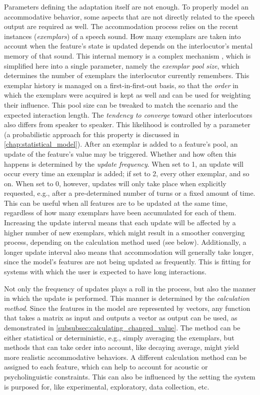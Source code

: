 Parameters defining the adaptation itself are not enough.
To properly model an accommodative behavior, some aspects that are not directly related to the speech output are required as well.
The accommodation process relies on the recent instances (\emph{exemplars}) of a speech sound.
How many exemplars are taken into account when the feature's state is updated depends on the interlocutor's mental memory of that sound.
This internal memory is a complex mechanism \citep{Baddeley2003working}, which is simplified here into a single parameter, namely the \emph{exemplar pool size}, which determines the number of exemplars the interlocutor currently remembers.
This exemplar history is managed on a first-in-first-out basis, so that the \emph{order} in which the exemplars were acquired is kept as well and can be used for weighting their influence.
This pool size can be tweaked to match the scenario and the expected interaction length.
The \emph{tendency to converge} toward other interlocutors also differs from speaker to speaker.
This likelihood is controlled by a parameter (a probabilistic approach for this property is discussed in \cref{chap:statistical_model}).
After an exemplar is added to a feature's pool, an update of the feature's value may be triggered.
Whether and how often this happens is determined by the \emph{update frequency}.
When set to 1, an update will occur every time an exemplar is added; if set to 2, every other exemplar, and so on.
When set to 0, however, updates will only take place when explicitly requested, e.g., after a pre-determined number of turns or a fixed amount of time.
This can be useful when all features are to be updated at the same time, regardless of how many exemplars have been accumulated for each of them.
Increasing the update interval means that each update will be affected by a higher number of new exemplars, which might result in a smoother converging process, depending on the calculation method used (see below).
Additionally, a longer update interval also means that accommodation will generally take longer, since the model's features are not being updated as frequently.
This is fitting for systems with which the user is expected to have long interactions.

Not only the frequency of updates plays a roll in the process, but also the manner in which the update is performed.
This manner is determined by the \emph{calculation method}.
Since the features in the model are represented by vectors, any function that takes a matrix as input and outputs a vector as output can be used, as demonstrated in \cref{subsubsec:calculating_changed_value}.
The method can be either statistical or deterministic, e.g., simply averaging the exemplars, but methods that can take order into account, like decaying average, might yield more realistic accommodative behaviors.
A different calculation method can be assigned to each feature, which can help to account for acoustic or psycholinguistic constraints.
This can also be influenced by the setting the system is purposed for, like experimental, exploratory, data collection, etc.

